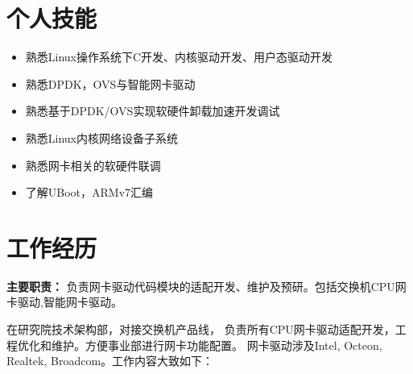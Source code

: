 \documentclass{resume}
\begin{document}
\section{个人技能}
        \begin{itemize}[parsep=0.5ex]
            \item  熟悉Linux操作系统下C开发、内核驱动开发、用户态驱动开发
            \item  熟悉DPDK，OVS与智能网卡驱动
            \item  熟悉基于DPDK/OVS实现软硬件卸载加速开发调试
            \item  熟悉Linux内核网络设备子系统
            \item  熟悉网卡相关的软硬件联调
            \item  了解UBoot，ARMv7汇编
        \end{itemize}
        \normalsize \par
\sepspace

\section{工作经历}
    \vspace{0.2em}

    \textbf{主要职责：} 
    负责网卡驱动代码模块的适配开发、维护及预研。包括交换机CPU网卡驱动,智能网卡驱动。

    \par


    \hspace{2em}在研究院技术架构部，对接交换机产品线，
    负责所有CPU网卡驱动适配开发，工程优化和维护。方便事业部进行网卡功能配置。
    网卡驱动涉及Intel, Octeon, Realtek, Broadcom。工作内容大致如下：
\end{document}
